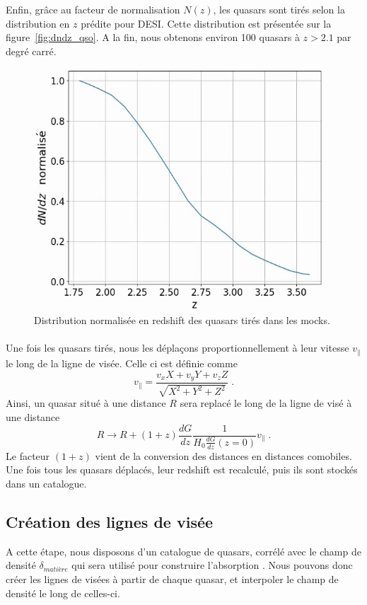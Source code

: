 \documentclass[11pt, twoside, a4paper, openright]{report}
\begin{document}
Enfin, grâce au facteur de normalisation $N(z)$, les quasars sont tirés selon la distribution en $z$ prédite pour DESI. Cette distribution est présentée sur la figure~\ref{fig:dndz_qso}. A la fin, nous obtenons environ \num{100} quasars à $z > \num{2.1}$ par degré carré.
\begin{figure}
  \centering
  \includegraphics[scale=0.5]{dndz_qso}
  \caption{Distribution normalisée en redshift des quasars tirés dans les mocks.}
\end{figure}

\paragraph{}
Une fois les quasars tirés, nous les déplaçons proportionnellement à leur vitesse $v_{\parallel}$ le long de la ligne de visée. Celle ci est définie comme
\begin{equation}
  v_{\parallel} = \frac{v_x X + v_y Y + v_z Z}{\sqrt{X^2 + Y^2 + Z^2}} \; .
\end{equation}
Ainsi, un quasar situé à une distance $R$ sera replacé le long de la ligne de visé à une distance
\begin{equation}
 R \rightarrow  R + (1+z) \frac{dG}{dz} \frac{1}{H_0 \frac{dG}{dz}(z=0)} v_{\parallel} \; .
\end{equation}
Le facteur $(1+z)$ vient de la conversion des distances en distances comobiles. Une fois tous les quasars déplacés, leur redshift est recalculé, puis ils sont stockés dans un catalogue.


\subsection{Création des lignes de visée}
A cette étape, nous disposons d'un catalogue de quasars, corrélé avec le champ de densité $\delta_{matière}$ qui sera utilisé pour construire l'absorption \lya{}. Nous pouvons donc créer les lignes de visées à partir de chaque quasar, et interpoler le champ de densité le long de celles-ci.




\end{document}
